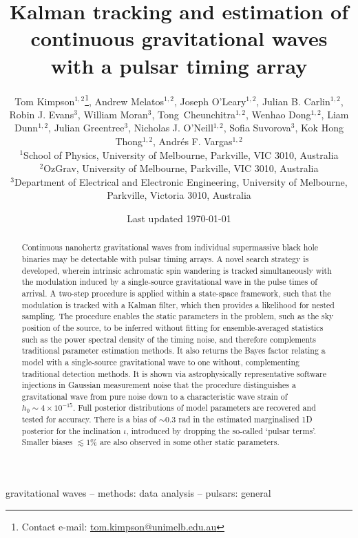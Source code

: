 \documentclass[fleqn,usenatbib,useAMS]{mnras}
\title[Kalman PTA]{Kalman tracking and estimation of continuous gravitational waves with a pulsar timing array}
\author[Kimpson]{Tom Kimpson$^{1,2}$\thanks{Contact e-mail: \href{tom.kimpson@unimelb.edu.au}{tom.kimpson@unimelb.edu.au}}, Andrew Melatos$^{1,2}$, Joseph O'Leary$^{1,2}$, Julian B. Carlin$^{1,2}$, Robin J. Evans$^{3}$, \newauthor William Moran$^{3}$, Tong Cheunchitra$^{1,2}$, Wenhao Dong$^{1,2}$, Liam Dunn$^{1,2}$, Julian Greentree$^{3}$, Nicholas J. O'Neill$^{1,2}$, \newauthor Sofia Suvorova$^{3}$, Kok Hong Thong$^{1,2}$, Andrés F. Vargas$^{1,2}$%
\\
$^{1}$School of Physics, University of Melbourne, Parkville, VIC 3010, Australia \\
$^{2}$OzGrav, University of Melbourne, Parkville, VIC 3010, Australia \\
$^{3}$Department of Electrical and Electronic Engineering, University of Melbourne, Parkville, Victoria 3010, Australia }
\date{Last updated \today}
\begin{document}
\label{firstpage}
\pagerange{\pageref{firstpage}--\pageref{lastpage}}
\maketitle

\begin{abstract}	
Continuous nanohertz gravitational waves from individual supermassive black hole binaries may be detectable with pulsar timing arrays. A novel search strategy is developed, wherein intrinsic achromatic spin wandering is tracked simultaneously with the modulation induced by a single-source gravitational wave in the pulse times of arrival. A two-step procedure is applied within a state-space framework, such that the modulation is tracked with a Kalman filter, which then provides a likelihood for nested sampling. The procedure enables the static parameters in the problem, such as the sky position of the source, to be inferred without fitting for ensemble-averaged statistics such as the power spectral density of the timing noise, and therefore complements traditional parameter estimation methods. It also returns the Bayes factor relating a model with a single-source gravitational wave to one without, complementing traditional detection methods. It is shown via astrophysically representative software injections in Gaussian measurement noise that the procedure distinguishes a gravitational wave from pure noise down to a characteristic wave strain of $h_0 \sim 4 \times 10^{-15}$. Full posterior distributions of model parameters are recovered and tested for accuracy. There is a bias of $\sim 0.3$ rad in the estimated marginalised 1D posterior for the inclination $\iota$, introduced by dropping the so-called `pulsar terms'. Smaller biases $\lesssim 1 \%$ are also observed in some other static parameters.
\end{abstract}

\begin{keywords}
gravitational waves -- methods: data analysis -- pulsars: general
\end{keywords}



\begingroup
\let\clearpage\relax
\endgroup
\newpage
\end{document}
